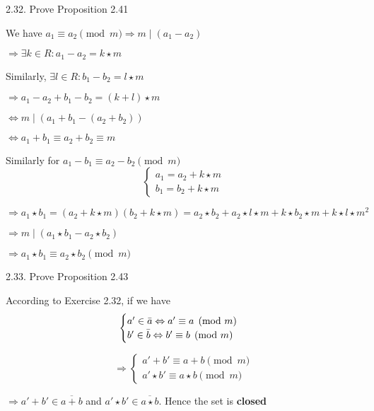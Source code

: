 2.32. Prove Proposition 2.41

    We have $a_1 \equiv a_2 \pmod m \Rightarrow m \mid (a_1 - a_2)$
    
    $\Rightarrow \exists k \in R: a_1 - a_2 = k \star m$ 
    
    Similarly, $\exists l \in R: b_1 - b_2 = l \star m$ 
    
    $\Rightarrow a_1 - a_2 + b_1 - b_2 = (k+l) \star m$ 
    
    $\Leftrightarrow m \mid (a_1 + b_1 - (a_2 + b_2))$ 
    
    $\Leftrightarrow a_1 + b_1 \equiv a_2 + b_2 \equiv m$ 
    
    Similarly for $a_1-b_1 \equiv a_2-b_2 \pmod m$ 
    \begin{equation*}
        \begin{cases}
            a_1 = a_2 + k \star m \\ b_1 = b_2 + k \star m
        \end{cases}
    \end{equation*}
    
    $\Rightarrow a_1 \star b_1 = (a_2 + k \star m)(b_2 + k \star m) = a_2 \star b_2 + a_2 \star l \star m + k \star b_2 \star m + k \star l \star m^2$
    
    $\Rightarrow m \mid (a_1 \star b_1 - a_2 \star b_2)$
    
    $\Rightarrow a_1 \star b_1 \equiv a_2 \star b_2 \pmod m$

2.33. Prove Proposition 2.43

According to Exercise 2.32, if we have 
\begin{equation*}
    \begin{cases}
    a' \in \Bar{a} \Leftrightarrow a' \equiv a \pmod m \\ 
    b' \in \Bar{b} \Leftrightarrow b' \equiv b \pmod m
    \end{cases}
\end{equation*} 

\begin{equation*}
   \Rightarrow \begin{cases}
   a' + b' \equiv a+b \pmod m \\ 
   a' \star b' \equiv a \star b \pmod m
   \end{cases} 
\end{equation*}

$\Rightarrow a'+b' \in \overline{a+b}$ and $a' \star b' \in \overline{a \star b}$. Hence the set is \textbf{closed}

